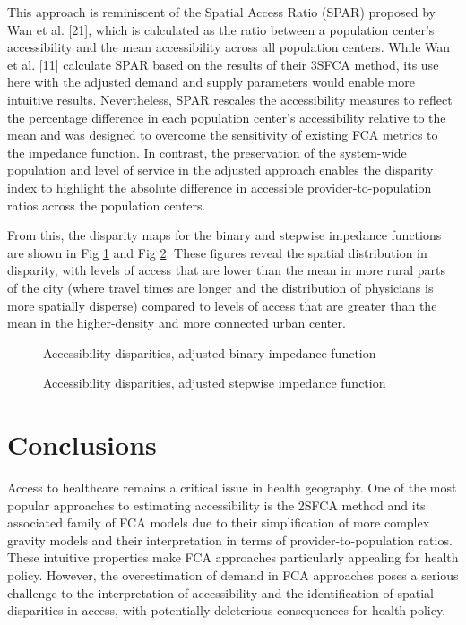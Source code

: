 \documentclass[10pt,letterpaper]{article}
\begin{document}
This approach is reminiscent of the Spatial Access Ratio (SPAR) proposed
by Wan et al. {[}21{]}, which is calculated as the ratio between a
population center's accessibility and the mean accessibility across all
population centers. While Wan et al. {[}11{]} calculate SPAR based on
the results of their 3SFCA method, its use here with the adjusted demand
and supply parameters would enable more intuitive results. Nevertheless,
SPAR rescales the accessibility measures to reflect the percentage
difference in each population center's accessibility relative to the
mean and was designed to overcome the sensitivity of existing FCA
metrics to the impedance function. In contrast, the preservation of the
system-wide population and level of service in the adjusted approach
enables the disparity index to highlight the absolute difference in
accessible provider-to-population ratios across the population centers.

From this, the disparity maps for the binary and stepwise impedance
functions are shown in Fig \ref{fig:fig14-map-disparities-binary} and
Fig \ref{fig:fig15-map-disparities-stepwise}. These figures reveal the
spatial distribution in disparity, with levels of access that are lower
than the mean in more rural parts of the city (where travel times are
longer and the distribution of physicians is more spatially disperse)
compared to levels of access that are greater than the mean in the
higher-density and more connected urban center.

\begin{figure}[htbp]
\centering
\caption{\label{fig:fig14-map-disparities-binary}Accessibility
disparities, adjusted binary impedance function}
\end{figure}

\begin{figure}[htbp]
\centering
\caption{\label{fig:fig15-map-disparities-stepwise}Accessibility
disparities, adjusted stepwise impedance function}
\end{figure}

\section{Conclusions}\label{conclusions}

Access to healthcare remains a critical issue in health geography. One
of the most popular approaches to estimating accessibility is the 2SFCA
method and its associated family of FCA models due to their
simplification of more complex gravity models and their interpretation
in terms of provider-to-population ratios. These intuitive properties
make FCA approaches particularly appealing for health policy. However,
the overestimation of demand in FCA approaches poses a serious challenge
to the interpretation of accessibility and the identification of spatial
disparities in access, with potentially deleterious consequences for
health policy.
\end{document}
